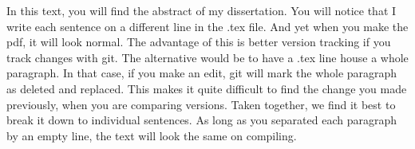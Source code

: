 In this text, you will find the abstract of my dissertation.
You will notice that I write each sentence on a different line in the .tex file.
And yet when you make the pdf, it will look normal.
The advantage of this is better version tracking if you track changes with git.
The alternative would be to have a .tex line house a whole paragraph.
In that case, if you make an edit, git will mark the whole paragraph as deleted and replaced.
This makes it quite difficult to find the change you made previously, when you are comparing versions. Taken together, we find it best to break it down to individual sentences.
As long as you separated each paragraph by an empty line, the text will look the same on compiling.

